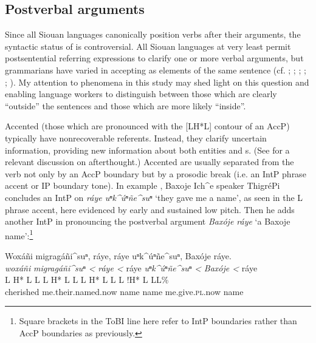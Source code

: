 \documentclass[output=paper]{LSP/langsci}
\begin{document}
\subsection{Postverbal arguments}\label{postverbalarguments}

Since all Siouan languages canonically position verbs after their arguments, the syntactic status of  is controversial. All Siouan languages at very least permit postsentential referring expressions to clarify one or more verbal arguments, but grammarians have varied in accepting  as elements of the same sentence (cf. \citealt{Rudin1998}; \citealt{Mithun1999}; \citealt[76]{Ingham2003}; \citealt[421]{Cumberland2005}; \citealt[292--293]{Boyle2007}; \citealt{Gordon2008}). My attention to  phenomena in this study may shed light on this question and enabling language workers to distinguish between those  which are clearly “outside” the sentences and those which are more likely “inside”.

Accented  (those which are pronounced with the [LH*L] contour of an AccP) typically have nonrecoverable referents. Instead, they clarify uncertain information, providing new information about both entities and s. (See \citealt[103]{Graczyk1991a} for a relevant discussion on  afterthought.) Accented  are usually separated from the verb not only by an AccP boundary but by a prosodic break (i.e. an IntP phrase accent or IP boundary tone). In example , Baxoje Ich\^{}e speaker ThigréPi concludes an IntP on \emph{ráye uⁿk\^{}úⁿñe\^{}suⁿ} `they gave me a name', as seen in the L phrase accent, here evidenced by early and sustained low pitch. Then he adds another IntP in pronouncing the postverbal argument \emph{Baxóje ráye} `a Baxoje name':\footnote{Square brackets in the ToBI line here refer to IntP boundaries rather than AccP boundaries as previously.}

\ea\label{thigrepiraye}
Woxáñi migragáñi\^{}suⁿ, ráye, ráye uⁿk\^{}úⁿñe\^{}suⁿ, Baxóje ráye.\footnotemark\\
\glll	\emph{woxáñi} 	\emph{migragáñi\^{}suⁿ <}		\emph{ráye <}	ráye		\emph{uⁿk\^{}úⁿñe\^{}suⁿ <}	\emph{Baxóje <}		ráye\\
	{\ob L H* L}		{L\cb}	{\ob L H* L L\cb}	{\ob L H* L}	{L\cb}	{\ob L !H* L} 		{L\cb{}L\%}\\
	cherished	me.their.named.now	name		name	me.give.\textsc{pl}.now				name\\
\end{document}
